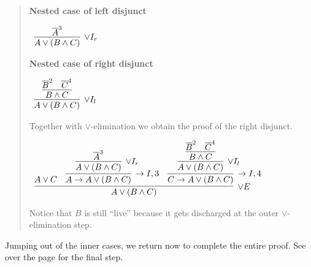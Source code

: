 \documentclass[11pt]{report}
\newcommand{\temp}[2]{{\overline{#2}}^{#1}}
\begin{document}
\begin{enumerate}
\begin{enumerate}
		\begin{quote}
			\textbf{Nested case of left disjunct}
				\begin{center}
					$\begin{array}{c}
						\infer[\lor I_{r}]{A \lor (B \land C)}
							{\temp{3}{A}}
					\end{array}$
				\end{center}

			\textbf{Nested case of right disjunct}

			\begin{center}
				$\begin{array}{c}
					\infer[\lor I_{l}]{A \lor (B \land C)}
						{\infer[]{B \land C}
							{\temp{2}{B}&\temp{4}{C}}}
				\end{array}$
			\end{center}

			Together with $\lor$-elimination we obtain the proof of the right disjunct.

			\begin{small}
				\begin{center}
					$\begin{array}{c}
						\infer[\lor E]{A \lor (B \land C)}
							{A \lor C
							&
							\infer[\to I,3]{A \to A \lor (B \land C)}
								{\infer[\lor I_{r}]{A \lor (B \land C)}
									{\temp{3}{A}}}
							&
							\infer[\to I, 4]{C \to A \lor (B \land C)}
								{\infer[\lor I_{l}]{A \lor (B \land C)}
									{\infer[]{B \land C}
										{\temp{2}{B}&\temp{4}{C}}}}}
					\end{array}$
				\end{center}
			\end{small}

			Notice that $B$ is still ``live'' because it gets discharged at the outer $\lor$-elimination step. 
		\end{quote}

		Jumping out of the inner cases, we return now to complete the entire proof. See over the page for the final step. 


\end{enumerate}
\end{enumerate}
\end{document}
